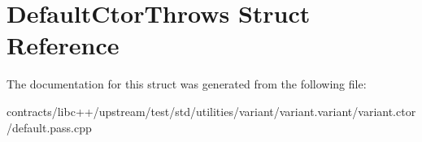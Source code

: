 \hypertarget{struct_default_ctor_throws}{}\section{Default\+Ctor\+Throws Struct Reference}
\label{struct_default_ctor_throws}


The documentation for this struct was generated from the following file\+:\begin{DoxyCompactItemize}
\item 
contracts/libc++/upstream/test/std/utilities/variant/variant.\+variant/variant.\+ctor/default.\+pass.\+cpp\end{DoxyCompactItemize}
